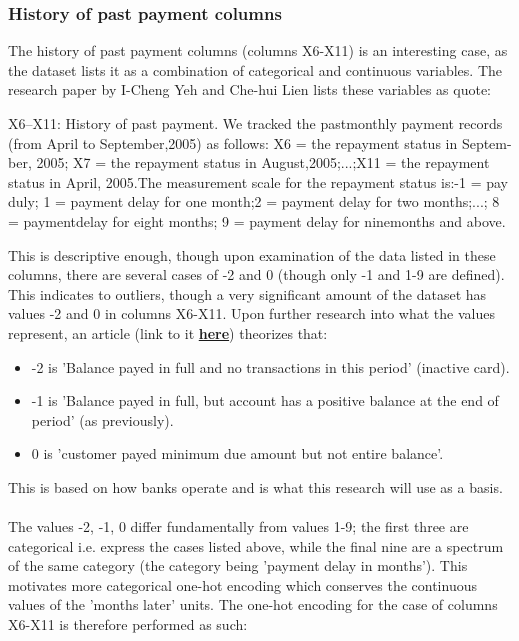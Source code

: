         \subsubsection{History of past payment columns}
            The history of past payment columns (columns X6-X11) is an interesting case, as the dataset lists it as a combination of categorical and continuous variables. The research paper by I-Cheng Yeh and Che-hui Lien \cite{CCdata} lists these variables as quote:
            \begin{displayquote}
                X6–X11: History of past payment. We tracked the pastmonthly payment records (from April to September,2005) as follows: X6 = the repayment status in Septem-ber,  2005;  X7 = the  repayment  status  in  August,2005;...;X11 = the repayment status in April, 2005.The measurement scale for the repayment status is:-1 = pay duly; 1 = payment delay for one month;2 = payment delay for two months;...; 8 = paymentdelay for eight months; 9 = payment delay for ninemonths and above.
            \end{displayquote}
            This is descriptive enough, though upon examination of the data listed in these columns, there are several cases of -2 and 0 (though only -1 and 1-9 are defined). This indicates to outliers, though a very significant amount of the dataset has values -2 and 0 in columns X6-X11. Upon further research into what the values represent, an article (link to it \href{http://inseaddataanalytics.github.io/INSEADAnalytics/CourseSessions/ClassificationProcessCreditCardDefault.html}{\textbf{here}}) theorizes that\cite{1}:
            \begin{itemize}
                \item -2 is 'Balance payed in full and no transactions in this period' (inactive card).
                \item -1 is 'Balance payed in full, but account has a positive balance at the end of period' (as previously).
                \item 0 is 'customer payed minimum due amount but not entire balance'.
            \end{itemize}
            This is based on how banks operate and is what this research will use as a basis.\\\\
            The values -2, -1, 0 differ fundamentally from values 1-9; the first three are categorical i.e. express the cases listed above, while the final nine are a spectrum of the same category (the category being 'payment delay in months'). This motivates more categorical one-hot encoding which conserves the continuous values of the 'months later' units. The one-hot encoding for the case of columns X6-X11 is therefore performed as such:
